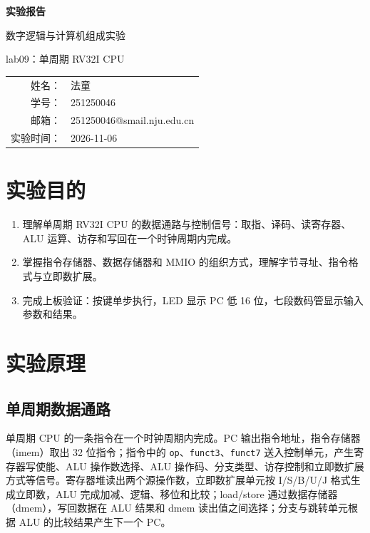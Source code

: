 \documentclass[12pt, a4paper]{ctexart}
\makeatletter
\newcommand{\coursename}{数字逻辑与计算机组成实验}
\newcommand{\expname}{lab09：单周期 RV32I CPU}
\newcommand{\expdate}{2026-11-06}
\newcommand{\stuname}{法童}
\newcommand{\stuid}{251250046}
\newcommand{\stumail}{251250046@smail.nju.edu.cn}
\makeatother
\begin{document}
\begin{titlepage}
    \centering
    \vspace*{4cm}
    {\Huge\bfseries 实验报告\par}
    \vspace{1.5cm}
    {\Large \coursename\par}
    \vspace{0.8cm}
    {\Large \expname\par}
    \vspace{3cm}
    {\large
    \begin{tabular}{rl}
        姓名： & \stuname \\
        学号： & \stuid \\
        邮箱： & \stumail \\
        实验时间： & \expdate \\
    \end{tabular}\par}
\end{titlepage}

\section{实验目的}
\begin{enumerate}
    \item 理解单周期 RV32I CPU 的数据通路与控制信号：取指、译码、读寄存器、ALU 运算、访存和写回在一个时钟周期内完成。
    \item 掌握指令存储器、数据存储器和 MMIO 的组织方式，理解字节寻址、指令格式与立即数扩展。
    \item 完成上板验证：按键单步执行，LED 显示 PC 低 16 位，七段数码管显示输入参数和结果。
\end{enumerate}

\section{实验原理}
\subsection{单周期数据通路}
单周期 CPU 的一条指令在一个时钟周期内完成。PC 输出指令地址，指令存储器（imem）取出 32 位指令；指令中的 \texttt{op}、\texttt{funct3}、\texttt{funct7} 送入控制单元，产生寄存器写使能、ALU 操作数选择、ALU 操作码、分支类型、访存控制和立即数扩展方式等信号。寄存器堆读出两个源操作数，立即数扩展单元按 I/S/B/U/J 格式生成立即数，ALU 完成加减、逻辑、移位和比较；load/store 通过数据存储器（dmem），写回数据在 ALU 结果和 dmem 读出值之间选择；分支与跳转单元根据 ALU 的比较结果产生下一个 PC。
\end{document}
